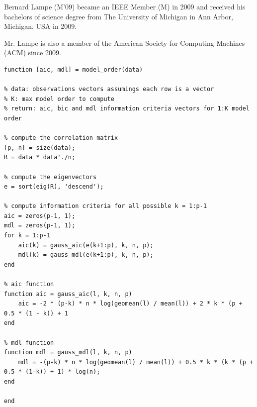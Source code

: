 \documentclass[journal]{IEEEtran}
\begin{document}
\nocite{*}



\begin{IEEEbiographynophoto}{Bernard Lampe}
(M'09) became an IEEE Member (M) in 2009 and received his bachelors of science degree from The University of Michigan in Ann Arbor, Michigan, USA in 2009.
\par Mr. Lampe is also a member of the American Society for Computing Machines (ACM) since 2009.
\end{IEEEbiographynophoto}

\begin{lstlisting}
function [aic, mdl] = model_order(data)

% data: observations vectors assumings each row is a vector
% K: max model order to compute
% return: aic, bic and mdl information criteria vectors for 1:K model order

% compute the correlation matrix
[p, n] = size(data);
R = data * data'./n;

% compute the eigenvectors
e = sort(eig(R), 'descend');

% compute information criteria for all possible k = 1:p-1
aic = zeros(p-1, 1);
mdl = zeros(p-1, 1);
for k = 1:p-1
    aic(k) = gauss_aic(e(k+1:p), k, n, p);
    mdl(k) = gauss_mdl(e(k+1:p), k, n, p);
end

% aic function
function aic = gauss_aic(l, k, n, p)
    aic = -2 * (p-k) * n * log(geomean(l) / mean(l)) + 2 * k * (p + 0.5 * (1 - k)) + 1
end

% mdl function
function mdl = gauss_mdl(l, k, n, p)
    mdl = -(p-k) * n * log(geomean(l) / mean(l)) + 0.5 * k * (k * (p + 0.5 * (1-k)) + 1) * log(n);
end

end
\end{lstlisting}

\end{document}

